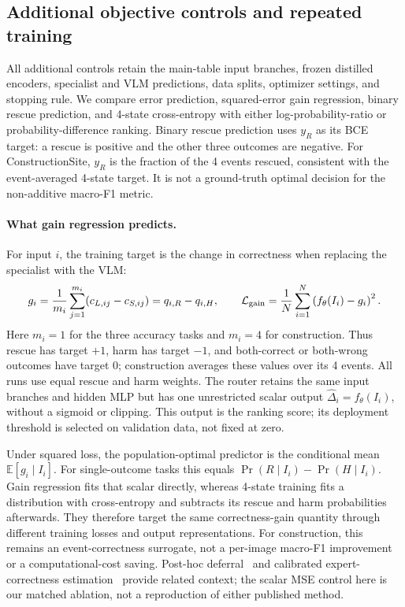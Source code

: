 \subsection{Additional objective controls and repeated training}
All additional controls retain the main-table input branches, frozen distilled encoders, specialist and VLM predictions, data splits, optimizer settings, and stopping rule. We compare error prediction, squared-error gain regression, binary rescue prediction, and 4-state cross-entropy with either log-probability-ratio or probability-difference ranking. Binary rescue prediction uses $y_R$ as its BCE target: a rescue is positive and the other three outcomes are negative. For ConstructionSite, $y_R$ is the fraction of the 4 events rescued, consistent with the event-averaged 4-state target. It is not a ground-truth optimal decision for the non-additive macro-F1 metric.

\paragraph{What gain regression predicts.}
For input $i$, the training target is the change in correctness when replacing the specialist with the VLM:
\begin{equation}
g_i=\frac{1}{m_i}\sum_{j=1}^{m_i}(c_{L,ij}-c_{S,ij})=q_{i,R}-q_{i,H},\qquad
\mathcal L_{\rm gain}=\frac1N\sum_{i=1}^N\left(f_\theta(I_i)-g_i\right)^2.
\label{eq:gain_regression}
\end{equation}
Here $m_i=1$ for the three accuracy tasks and $m_i=4$ for construction. Thus rescue has target $+1$, harm has target $-1$, and both-correct or both-wrong outcomes have target $0$; construction averages these values over its 4 events. All runs use equal rescue and harm weights. The router retains the same input branches and hidden MLP but has one unrestricted scalar output $\widehat\Delta_i=f_\theta(I_i)$, without a sigmoid or clipping. This output is the ranking score; its deployment threshold is selected on validation data, not fixed at zero.

Under squared loss, the population-optimal predictor is the conditional mean $\mathbb E[g_i\mid I_i]$. For single-outcome tasks this equals $\Pr(R\mid I_i)-\Pr(H\mid I_i)$. Gain regression fits that scalar directly, whereas 4-state training fits a distribution with cross-entropy and subtracts its rescue and harm probabilities afterwards. They therefore target the same correctness-gain quantity through different training losses and output representations. For construction, this remains an event-correctness surrogate, not a per-image macro-F1 improvement or a computational-cost saving. Post-hoc deferral~\cite{posthocdefer} and calibrated expert-correctness estimation~\cite{calibrateddefer} provide related context; the scalar MSE control here is our matched ablation, not a reproduction of either published method.

